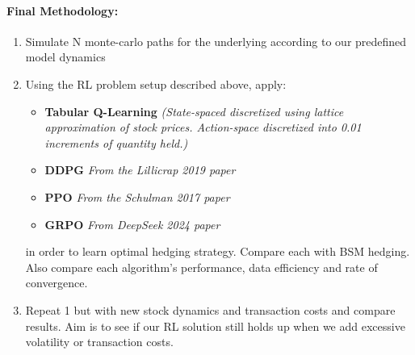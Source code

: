 \documentclass{article}
\begin{document}
\paragraph{Final Methodology:} 
\begin{enumerate}
    \item Simulate N monte-carlo paths for the underlying according to our predefined model dynamics
    \item Using the RL problem setup described above, apply:
    \begin{itemize}
        \item \textbf{Tabular Q-Learning} \textit{(State-spaced discretized using lattice approximation of stock prices. Action-space discretized into 0.01 increments of quantity held.)}
        \item \textbf{DDPG} \textit{From the Lillicrap 2019 paper}\cite{lillicrap}
        \item \textbf{PPO} \textit{From the Schulman 2017 paper \cite{schulman}}
        \item \textbf{GRPO} \textit{From DeepSeek 2024 paper} \cite{deepseek}
    \end{itemize}
    in order to learn optimal hedging strategy. Compare each with BSM hedging. Also compare each algorithm's performance, data efficiency and rate of convergence.
    \item Repeat 1 but with new stock dynamics and transaction costs and compare results. Aim is to see if our RL solution still holds up when we add excessive volatility or transaction costs.
\end{enumerate}

\end{document}
